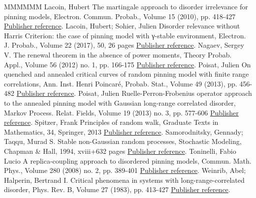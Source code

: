 \begin{thebibliography}{MMMMMM}
 Lacoin, Hubert The martingale approach to disorder irrelevance for pinning models, Electron. Commun. Probab., Volume 15 (2010), pp. 418-427 \href{https://ahl.centre-mersenne.org/item/AHL_2019__2__281_0/#L10}{Publisher reference}.
 Lacoin, Hubert; Sohier, Julien Disorder relevance without Harris Criterion: the case of pinning model with γ-stable environment, Electron. J. Probab., Volume 22 (2017), 50, 26 pages \href{https://ahl.centre-mersenne.org/item/AHL_2019__2__281_0/#LS16+}{Publisher reference}.
 Nagaev, Sergey V. The renewal theorem in the absence of power moments, Theory Probab. Appl., Volume 56 (2012) no. 1, pp. 166-175 \href{https://ahl.centre-mersenne.org/item/AHL_2019__2__281_0/#Na2012}{Publisher reference}.
 Poisat, Julien On quenched and annealed critical curves of random pinning model with finite range correlations, Ann. Inst. Henri Poincaré, Probab. Stat., Volume 49 (2013), pp. 456-482 \href{https://ahl.centre-mersenne.org/item/AHL_2019__2__281_0/#P13a}{Publisher reference}.
 Poisat, Julien Ruelle-Perron-Frobenius operator approach to the annealed pinning model with Gaussian long-range correlated disorder, Markov Process. Relat. Fields, Volume 19 (2013) no. 3, pp. 577-606 \href{https://ahl.centre-mersenne.org/item/AHL_2019__2__281_0/#P13}{Publisher reference}.
 Spitzer, Frank Principles of random walk, Graduate Texts in Mathematics, 34, Springer, 2013 \href{https://ahl.centre-mersenne.org/item/AHL_2019__2__281_0/#Spitzer}{Publisher reference}.
 Samorodnitsky, Gennady; Taqqu, Murad S. Stable non-Gaussian random processes, Stochastic Modeling, Chapman \& Hall, 1994, xviii+632 pages \href{https://ahl.centre-mersenne.org/item/AHL_2019__2__281_0/#ST94}{Publisher reference}.
 Toninelli, Fabio Lucio A replica-coupling approach to disordered pinning models, Commun. Math. Phys., Volume 280 (2008) no. 2, pp. 389-401 \href{https://ahl.centre-mersenne.org/item/AHL_2019__2__281_0/#T08}{Publisher reference}.
 Weinrib, Abel; Halperin, Bertrand I. Critical phenomena in systems with long-range-correlated disorder, Phys. Rev. B, Volume 27 (1983), pp. 413-427 \href{https://ahl.centre-mersenne.org/item/AHL_2019__2__281_0/#WH83}{Publisher reference}.
\end{thebibliography}

